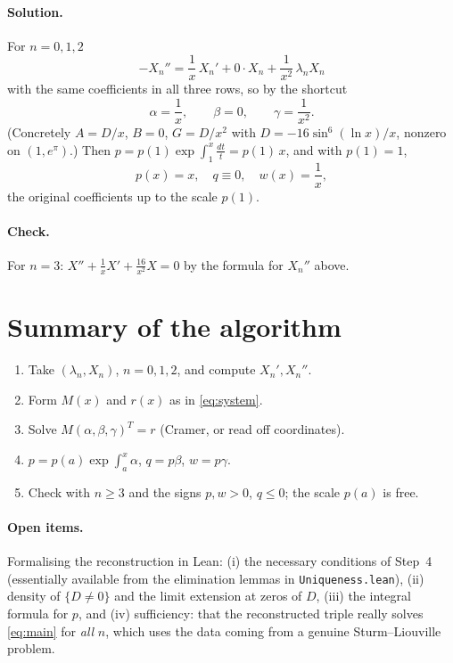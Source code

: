 \documentclass[11pt]{article}
\theoremstyle{remark}
\begin{document}
\paragraph{Solution.} For $n=0,1,2$
\[
  -X_n''=\frac1x\,X_n'+0\cdot X_n+\frac1{x^2}\,\lambda_nX_n
\]
with the same coefficients in all three rows, so by the shortcut
\[
  \alpha=\frac1x,\qquad\beta=0,\qquad\gamma=\frac1{x^2}.
\]
(Concretely $A=D/x$, $B=0$, $G=D/x^2$ with $D=-16\sin^6(\ln x)/x$, nonzero on
$(1,e^\pi)$.) Then $p=p(1)\exp\int_1^x\frac{dt}{t}=p(1)\,x$, and with $p(1)=1$,
\[
  \boxed{p(x)=x,\quad q\equiv0,\quad w(x)=\frac1x,}
\]
the original coefficients up to the scale $p(1)$.

\paragraph{Check.} For $n=3$: $X''+\frac1xX'+\frac{16}{x^2}X=0$ by the formula
for $X_n''$ above.

\section{Summary of the algorithm}
\begin{enumerate}[nosep]
  \item Take $(\lambda_n,X_n)$, $n=0,1,2$, and compute $X_n',X_n''$.
  \item Form $M(x)$ and $r(x)$ as in \eqref{eq:system}.
  \item Solve $M(\alpha,\beta,\gamma)^{T}=r$ (Cramer, or read off coordinates).
  \item $p=p(a)\exp\int_a^x\alpha$, $q=p\beta$, $w=p\gamma$.
  \item Check with $n\ge3$ and the signs $p,w>0$, $q\le0$; the scale $p(a)$ is free.
\end{enumerate}

\paragraph{Open items.} Formalising the reconstruction in Lean: (i) the
necessary conditions of Step~4 (essentially available from the elimination
lemmas in \texttt{Uniqueness.lean}), (ii) density of $\{D\neq0\}$ and the
limit extension at zeros of $D$, (iii) the integral formula for $p$, and
(iv) sufficiency: that the reconstructed triple really solves \eqref{eq:main}
for \emph{all} $n$, which uses the data coming from a genuine
Sturm--Liouville problem.
\end{document}
